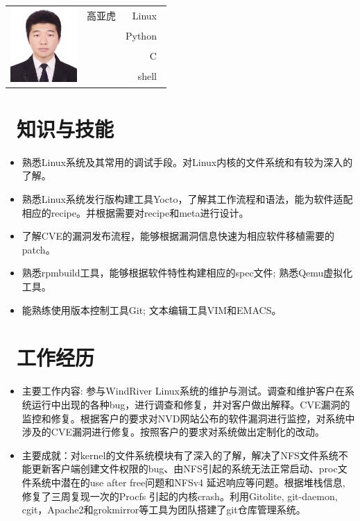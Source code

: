 \documentclass{resume}
\begin{document}
\Large{
  \begin{tabu}{ c l r }
     & \scshape{高亚虎} & {Linux~} \\
    &  & {Python~} \\
    &  & {C~} \\
    &  & {shell~}
  \end{tabu}
}
\section{\faGraduationCap\ 知识与技能}\normalsize
\begin{itemize}
  \item {熟悉Linux系统及其常用的调试手段。对Linux内核的文件系统和有较为深入的了解。}
  \item {熟悉Linux系统发行版构建工具Yocto，了解其工作流程和语法，能为软件适配相应的recipe。并根据需要对recipe和meta进行设计。}
  \item {了解CVE的漏洞发布流程，能够根据漏洞信息快速为相应软件移植需要的patch。}
  \item {熟悉rpmbuild工具，能够根据软件特性构建相应的spec文件; 熟悉Qemu虚拟化工具。}
  \item {能熟练使用版本控制工具Git; 文本编辑工具VIM和EMACS。}
  \end{itemize}

\section{\faUsers\ 工作经历}\normalsize
{}
\begin{itemize}
\item {主要工作内容: 参与WindRiver Linux系统的维护与测试。调查和维护客户在系统运行中出现的各种bug，进行调查和修复，并对客户做出解释。CVE漏洞的监控和修复。根据客户的要求对NVD网站公布的软件漏洞进行监控，对系统中涉及的CVE漏洞进行修复。按照客户的要求对系统做出定制化的改动。}
\item {主要成就：对kernel的文件系统模块有了深入的了解，解决了NFS文件系统不能更新客户端创建文件权限的bug、由NFS引起的系统无法正常启动、proc文件系统中潜在的use after free问题和NFSv4 延迟响应等问题。根据堆栈信息, 修复了三周复现一次的Procfs 引起的内核crash。利用Gitolite, git-daemon, cgit，Apache2和grokmirror等工具为团队搭建了git仓库管理系统。}
  \end{itemize}
\end{document}
